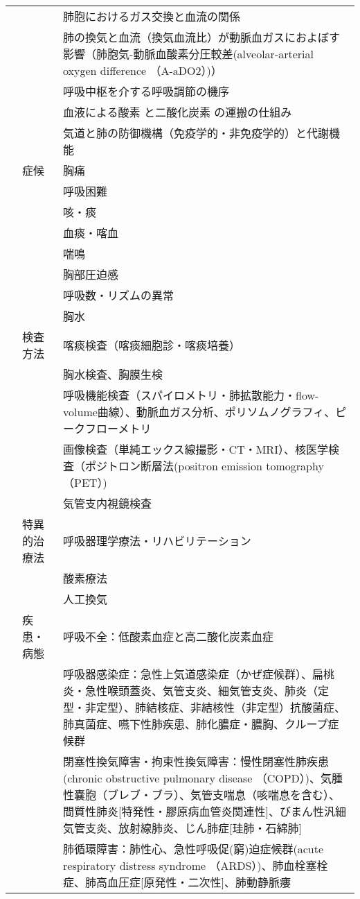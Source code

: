 \begin{xltabular}{\linewidth}{XXX}
 &  & 肺胞におけるガス交換と血流の関係 \\
 &  & 肺の換気と血流（換気血流比）が動脈血ガスにおよぼす影響（肺胞気-動脈血酸素分圧較差(alveolar-arterial oxygen difference （A-aDO2）)） \\
 &  & 呼吸中枢を介する呼吸調節の機序 \\
 &  & 血液による酸素 と二酸化炭素 の運搬の仕組み \\
 &  & 気道と肺の防御機構（免疫学的・非免疫学的）と代謝機能 \\
 & 症候 & 胸痛 \\
 &  & 呼吸困難 \\
 &  & 咳・痰 \\
 &  & 血痰・喀血 \\
 &  & 喘鳴 \\
 &  & 胸部圧迫感 \\
 &  & 呼吸数・リズムの異常 \\
 &  & 胸水 \\
 & 検査方法 & 喀痰検査（喀痰細胞診・喀痰培養） \\
 &  & 胸水検査、胸膜生検 \\
 &  & 呼吸機能検査（スパイロメトリ・肺拡散能力・flow-volume曲線）、動脈血ガス分析、ポリソムノグラフィ、ピークフローメトリ \\
 &  & 画像検査（単純エックス線撮影・CT・MRI）、核医学検査（ポジトロン断層法(positron emission tomography （PET）) \\
 &  & 気管支内視鏡検査 \\
 & 特異的治療法 & 呼吸器理学療法・リハビリテーション \\
 &  & 酸素療法 \\
 &  & 人工換気 \\
 & 疾患・病態 & 呼吸不全：低酸素血症と高二酸化炭素血症 \\
 &  & 呼吸器感染症：急性上気道感染症（かぜ症候群）、扁桃炎・急性喉頭蓋炎、気管支炎、細気管支炎、肺炎（定型・非定型）、肺結核症、非結核性（非定型）抗酸菌症、肺真菌症、嚥下性肺疾患、肺化膿症・膿胸、クループ症候群 \\
 &  & 閉塞性換気障害・拘束性換気障害：慢性閉塞性肺疾患(chronic obstructive pulmonary disease （COPD）)、気腫性嚢胞（ブレブ・ブラ）、気管支喘息（咳喘息を含む）、間質性肺炎[特発性・膠原病血管炎関連性]、びまん性汎細気管支炎、放射線肺炎、じん肺症[珪肺・石綿肺] \\
 &  & 肺循環障害：肺性心、急性呼吸促(窮)迫症候群(acute respiratory distress syndrome （ARDS）)、肺血栓塞栓症、肺高血圧症[原発性・二次性]、肺動静脈瘻 \\

\end{xltabular}
